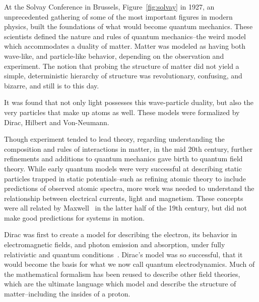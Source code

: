 At the Solvay Conference in Brussels, Figure~\ref{fig:solvay} in 1927, an
unprecedented gathering of some of the most important figures in modern physics,
built the foundations of what would become quantum mechanics. These scientists
defined the nature and rules of quantum mechanics--the weird model which
accommodates a duality of matter. Matter was modeled as having both wave-like,
and particle-like behavior, depending on the observation and experiment. The
notion that probing the structure of matter did not yield a simple,
deterministic hierarchy of structure was revolutionary, confusing, and bizarre,
and still is to this day.

It was found that not only light possesses this wave-particle duality, but also
the very particles that make up atoms as well. These models were formalized by
Dirac, Hilbert and Von-Neumann.

Though experiment tended to lead theory, regarding understanding the composition
and rules of interactions in matter, in the mid 20th century, further
refinements and additions to quantum mechanics gave birth to quantum field
theory. While early quantum models were very successful at describing static
particles trapped in static potentials--such as refining atomic theory to
include predictions of observed atomic spectra, more work was needed to
understand the relationship between electrical currents, light and magnetism.
These concepts were all related by Maxwell~\cite{Maxwell1865} in the latter half
of the 19th century, but did not make good predictions for systems in motion.

Dirac was first to create a model for describing the electron, its behavior in
electromagnetic fields, and photon emission and absorption, under fully
relativistic and quantum conditions~\cite{Dirac}. Dirac's model was so
successful, that it would become the basis for what we now call quantum
electrodynamics. Much of the mathematical formalism has been reused to describe
other field theories, which are the ultimate language which model and describe
the structure of matter--including the insides of a proton. 

